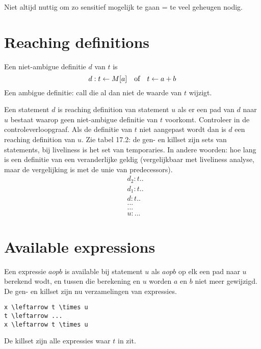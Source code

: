 Niet altijd nuttig om zo sensitief mogelijk te gaan = te veel geheugen nodig.

\section{Reaching definitions}
Een niet-ambigue definitie $d$ van $t$ is
$$d: t \leftarrow M[a] \quad\hbox{of}\quad t \leftarrow a + b$$
Een ambigue definitie: call die al dan niet de waarde van $t$ wijzigt.

Een statement $d$ is reaching definition van statement $u$ als er een pad van $d$ naar $u$ bestaat waarop geen niet-ambigue definitie van $t$ voorkomt. Controleer in de controleverloopgraaf. Als de definitie van $t$ niet aangepast wordt dan is $d$ een reaching definition van $u$.  Zie tabel 17.2: de gen- en killset zijn sets van statements, bij liveliness is het set van temporaries. In andere woorden: hoe lang is een definitie van een veranderlijke geldig (vergelijkbaar met liveliness analyse, maar de vergelijking is met de unie van predecessors).
\begin{equation*}
\begin{split}
	& d_2: t \left ...  \\
	& d_1: t \left ... \\
	& d:t \left ... \\
	& ... \\
	& ... \\
	& u: ...
\end{split}
\end{equation*}


\section{Available expressions}
Een expressie $a op b$ is available bij statement $u$ als $a op b$ op elk een pad naar $u$ berekend wodt, en tussen die berekening en $u$ worden $a$ en $b$ niet meer gewijzigd.
De gen- en killset zijn nu verzamelingen van expressies. 
\begin{lstlisting}
x \leftarrow t \times u
t \leftarrow ...
x \leftarrow t \times u
\end{lstlisting}
De killset zijn alle expressies waar $t$ in zit.


